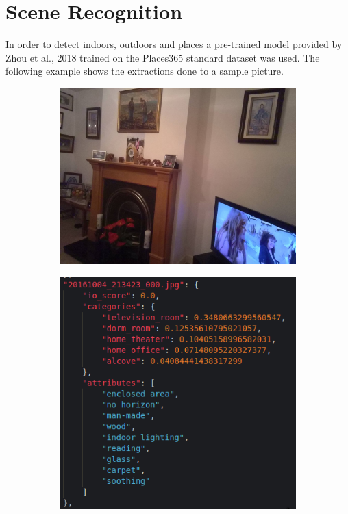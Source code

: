 \section{Scene Recognition}
\label{sec:scene_recognition}
  In order to detect indoors, outdoors and places a pre-trained model provided by Zhou et al., 2018 \cite{Zhou2018}  trained on the Places365 standard dataset was used. The following example shows the extractions done to a sample picture. 

  \begin{figure}[H]
    \centering
    \captionsetup{justification=centering}

    \begin{subfigure}{0.525\textwidth}
    
    \includegraphics[width=\textwidth]{Sections/4InitialWork/4_images_random/dataset_place.jpg} 
    \caption{}
    \end{subfigure}
    \begin{subfigure}{0.4\textwidth}
    \includegraphics[width=\textwidth]{Sections/4InitialWork/4_images_random/places_detect.png}
    \caption{}
    \end{subfigure}
    

\end{figure}
